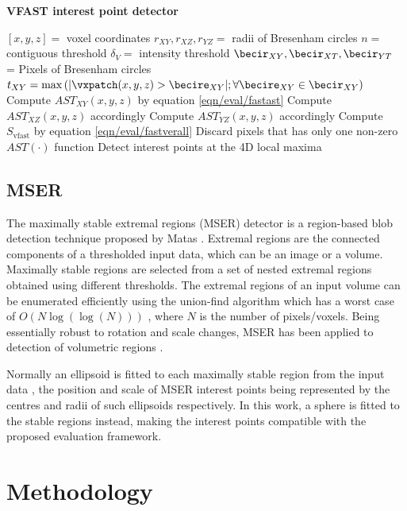 \begin{algorithm}
\caption{\textbf{VFAST interest point detector}}
\label{algo/eval/vfast}
\begin{algorithmic}
	\REQUIRE $[x,y,z] = $ voxel coordinates
	\REQUIRE $r_{XY},r_{XZ},r_{YZ} = $ radii of Bresenham circles
	\REQUIRE $n = $ contiguous threshold
	\REQUIRE $\delta_{V} = $ intensity threshold
	\STATE $\becir_{XY},\becir_{XT},\becir_{YT}$ = Pixels of Bresenham circles
	\STATE $t_{XY} = \max\left(| \vxpatch(x,y,z) > \becire_{XY}|; \forall \becire_{XY} \in \becir_{XY} \right)$
	\STATE Compute $AST_{XY}(x,y,z)$ by equation \ref{eqn/eval/fastast}
	\STATE Compute $AST_{XZ}(x,y,z)$ accordingly 
	\STATE Compute $AST_{YZ}(x,y,z)$ accordingly 
	\STATE Compute $S_\textrm{vfast}$ by equation \ref{eqn/eval/fastverall}
	\STATE Discard pixels that has only one non-zero $AST(\cdot)$ function 
	\STATE Detect interest points at the 4D local maxima 
\end{algorithmic}
\end{algorithm}

\subsection{MSER}
The maximally stable extremal regions (MSER) detector is a region-based blob detection technique proposed by Matas \etal \cite{Matas2004}. Extremal regions are the connected components of a thresholded input data, which can be an image or a volume. Maximally stable regions are selected from a set of nested extremal regions obtained using different thresholds. The extremal regions of an input volume can be enumerated efficiently using the union-find algorithm which has a worst case of $O(N\log(\log(N)))$ \cite{Matas2004}, where $N$ is the number of pixels/voxels. 
Being essentially robust to rotation and scale changes, MSER has been applied to detection of volumetric regions \cite{Donoser2006,Riemenschneider2009}.

Normally an ellipsoid is fitted to each maximally stable region from the input data \cite{Matas2004}, the position and scale of MSER interest points being represented by the centres and radii of such ellipsoids respectively. In this work, a sphere is fitted to the stable regions instead, making the interest points compatible with the proposed evaluation framework.

\section{Methodology}
\label{sec/eval/methodology}

